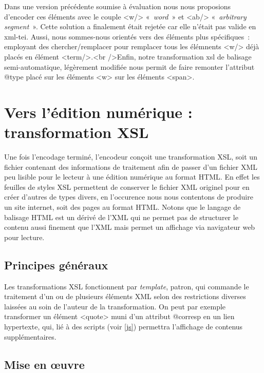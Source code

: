 \documentclass[12pt, a4paper]{article}
\begin{document}
Dans une version précédente soumise à évaluation nous nous proposions d'encoder ces éléments avec le couple <w/> «~\textit{word}~» et <ab/> «~\textit{arbitrary segment}~». Cette solution a finalement était rejetée car elle n'était pas valide en xml-tei. Aussi, nous sommes-nous orientés vers des éléments plus spécifiques~: employant des chercher/remplacer pour remplacer tous les élémnents <w/> déjà placés en élément <term/>.<br />Enfin, notre transformation xsl de balisage semi-automatique, légèrement modifiée nous permit de faire remonter l'attribut @type placé sur les éléments <w> sur les éléments <span>.



\section{Vers l'édition numérique : transformation XSL}
\label{ref:xsl_gen}
Une fois l'encodage terminé, l'encodeur conçoit une transformation XSL, soit un fichier contenant des informations de traitement afin de passer d'un fichier XML peu lisible pour le lecteur à une édition numérique au format HTML. En effet les feuilles de styles XSL permettent de conserver le fichier XML originel pour en créer d'autres de types divers, en l'occurence nous nous contentons de produire un site internet, soit des pages au format HTML. Notons que le langage de balisage HTML est un dérivé de l'XML qui ne permet pas de structurer le contenu aussi finement que l'XML mais permet un affichage via navigateur web pour lecture.
    \subsection{Principes généraux}
Les transformations XSL fonctionnent par \textit{template}, patron, qui commande le traitement d'un ou de plusieurs éléments XML selon des restrictions diverses laissées au soin de l'auteur de la transformation. On peut par exemple transformer un élément <quote> muni d'un attribut @corresp en un lien hypertexte, qui, lié à des scripts (voir \ref{js}) permettra l'affichage de contenus supplémentaires. 
    \subsection{Mise en œuvre}
\end{document}
